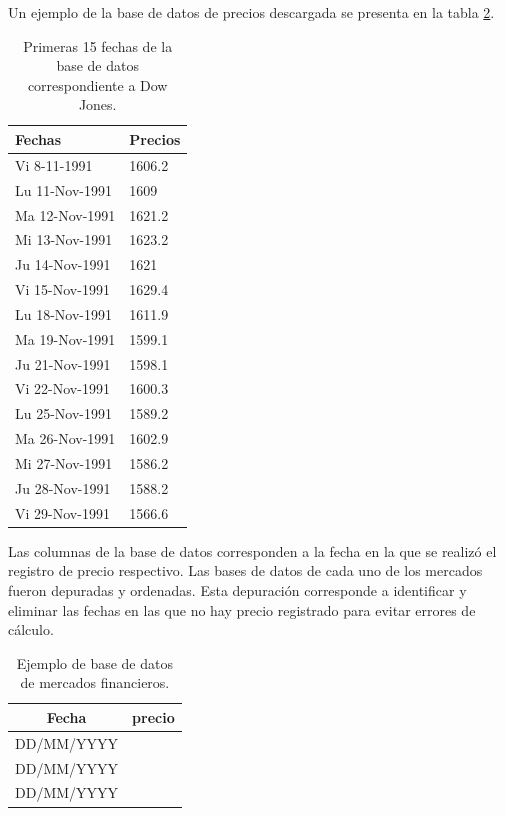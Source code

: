 Un ejemplo de la base de datos de precios descargada se presenta en la tabla \ref{ejemplo_data}.
\begin{table}[]
	\begin{tabular}{|l|l|}
		\hline
		Fechas         & Precios \\ \hline
		Vi 8-11-1991   & 1606.2  \\ \hline
		Lu 11-Nov-1991 & 1609    \\ \hline
		Ma 12-Nov-1991 & 1621.2  \\ \hline
		Mi 13-Nov-1991 & 1623.2  \\ \hline
		Ju 14-Nov-1991 & 1621    \\ \hline
		Vi 15-Nov-1991 & 1629.4  \\ \hline
		Lu 18-Nov-1991 & 1611.9  \\ \hline
		Ma 19-Nov-1991 & 1599.1  \\ \hline
		Ju 21-Nov-1991 & 1598.1  \\ \hline
		Vi 22-Nov-1991 & 1600.3  \\ \hline
		Lu 25-Nov-1991 & 1589.2  \\ \hline
		Ma 26-Nov-1991 & 1602.9  \\ \hline
		Mi 27-Nov-1991 & 1586.2  \\ \hline
		Ju 28-Nov-1991 & 1588.2  \\ \hline
		Vi 29-Nov-1991 & 1566.6  \\ \hline
	\end{tabular}
\label{fechasdatabase1}
\caption{Primeras 15 fechas de la base de datos correspondiente a Dow Jones.}
\end{table}

Las columnas de la base de datos corresponden a la fecha en la que se realizó el registro de precio respectivo.
Las bases de datos de cada uno de los mercados fueron depuradas y ordenadas. Esta depuración corresponde a identificar y eliminar las fechas en las que no hay precio registrado para evitar errores de cálculo.

\begin{table}
\begin{center}
\begin{tabular}{|c|c|}
	\hline 
	Fecha & precio \\ 
	\hline 
	DD/MM/YYYY & $$$$ \\ 
	DD/MM/YYYY & $$$$ \\ 
	DD/MM/YYYY & $$$$ \\ 
	\hline 
\end{tabular} 
	\label{ejemplo_data}
	\caption{Ejemplo de base de datos de mercados financieros.}
\end{center}
\end{table}

